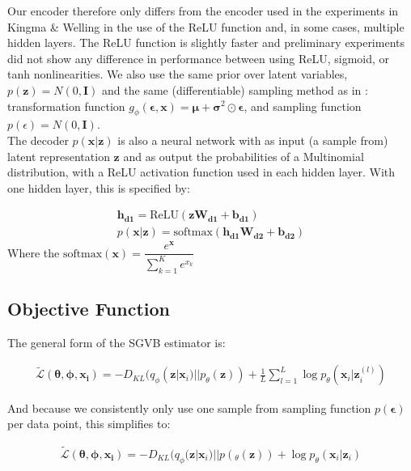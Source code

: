 \documentclass{report}
\begin{document}
Our encoder therefore only differs from the encoder used in the experiments in Kingma \& Welling \cite{kingma2013auto} in the use of the ReLU function and, in some cases, multiple hidden layers. The ReLU function is slightly faster and preliminary experiments did not show any difference in performance between using ReLU, sigmoid, or tanh nonlinearities. We also use the same prior over latent variables, $p(\mathbf{z}) = N(0,\textbf{I})$ and the same (differentiable) sampling method as in \cite{kingma2013auto}: transformation function $g_\phi(\boldsymbol{\epsilon},\mathbf{x}) = \boldsymbol{\mu} + \boldsymbol{\sigma}^2\odot \boldsymbol{\epsilon}$, and sampling function $p(\epsilon) = N(0,\textbf{I})$. \\
The decoder $p(\mathbf{x}|\mathbf{z})$ is also a neural network with as input (a sample from) latent representation $\mathbf{z}$ and as output the probabilities of a Multinomial distribution, with a ReLU activation function used in each hidden layer. With one hidden layer, this is specified by:

\begin{align}
\mathbf{h_{d1}} = \text{ReLU}(\mathbf{zW_{d1}+b_{d1}})
\\
p(\mathbf{x}|\mathbf{z}) = \text{softmax} (\mathbf{h_{d1}W_{d2}}+\mathbf{b_{d2}})
\end{align}
Where the $\text{softmax}(\mathbf{x}) = \dfrac{e^{\mathbf{x}}}{\sum_{k=1}^{K}e^{x_k}}$


\subsection{Objective Function}
The general form of the SGVB estimator is:

\begin{align}
\tilde{\mathcal{L}}(\boldsymbol{\theta}, \boldsymbol{\phi}, \mathbf{x_i}) = -D_{KL}(q_\phi (\mathbf{z}|\mathbf{x}_i)||p_\theta(\mathbf{z}))  + \frac{1}{L}\sum_{l=1}^{L}\log p_\theta(\mathbf{x}_i|\mathbf{z}_i^{(l)})
\end{align}

And because we consistently only use one sample from sampling function $p(\boldsymbol{\epsilon})$ per data point, this simplifies to:

\begin{align}\label{lb_summary}
\tilde{\mathcal{L}}(\boldsymbol{\theta}, \boldsymbol{\phi}, \mathbf{x_i}) = -D_{KL}(q_\phi (\mathbf{z}|\mathbf{x}_i)||p(_\theta(\mathbf{z}))  + \log p_\theta(\mathbf{x}_i|\mathbf{z}_i)
\end{align}
\end{document}
